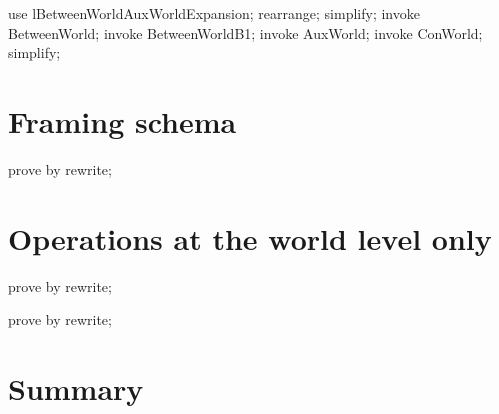 \begin{LPScript}\begin{zproof}[lBetweenWorldFullExpansion]
    use lBetweenWorldAuxWorldExpansion;
    rearrange;
    simplify;
    invoke BetweenWorld;
    invoke BetweenWorldB1;
    invoke AuxWorld;
    invoke ConWorld;
    simplify;
\end{zproof}\end{LPScript}

\section{Framing schema}

\begin{LDCheck}\begin{zproof}
   prove by rewrite;
\end{zproof}\end{LDCheck}


\section{Operations at the world level only}

\begin{LDCheck}\begin{zproof}
   prove by rewrite;
\end{zproof}\end{LDCheck}

\begin{LDCheck}\begin{zproof}
   prove by rewrite;
\end{zproof}\end{LDCheck}

\newpage
\section{Summary}\label{ch5.ps.summary}
\lpscriptsummary
